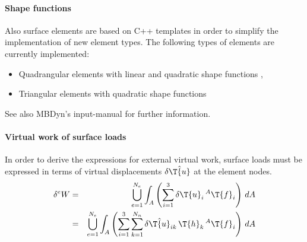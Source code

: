 \paragraph{Shape functions}
Also surface elements are based on C++ templates in order to simplify the implementation of new element types.
The following types of elements are currently implemented:
\begin{itemize}
\item Quadrangular elements with linear and quadratic shape functions \cite{BATHE2016}, \cite{DHONDT2004}
\item Triangular elements with quadratic shape functions \cite{CODEASTERR30301}
\end{itemize}
See also MBDyn's input-manual for further information.

\paragraph{Virtual work of surface loads}
In order to derive the expressions for external virtual work, surface loads must be expressed in terms of
virtual displacements $\delta\hat{\T{u}}$ at the element nodes.
\begin{eqnarray}
\delta{^e}W & = & \bigcup_{e=1}^{N_e}\int_{A} \left(\sum_{i=1}^3 \delta\T{u}_i\,{^A}\T{f}_i \right)\,dA \\
          & = & \bigcup_{e=1}^{N_e}\int_{A} \left(\sum_{i=1}^3 \sum_{k=1}^{N_n} \delta\hat{\T{u}}_{ik} \, \T{h}_{k} \, {^A}\T{f}_i \right) \, dA
\end{eqnarray}
